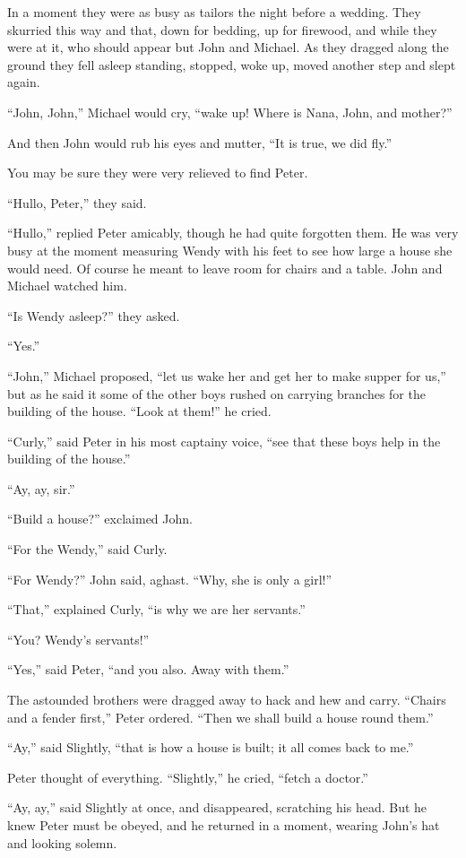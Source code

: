 In a moment they were as busy as tailors the night before a wedding.
They skurried this way and that, down for bedding, up for firewood, and
while they were at it, who should appear but John and Michael. As they
dragged along the ground they fell asleep standing, stopped, woke up,
moved another step and slept again.

``John, John,'' Michael would cry, ``wake up! Where is Nana, John, and
mother?''

And then John would rub his eyes and mutter, ``It is true, we did fly.''

You may be sure they were very relieved to find Peter.

``Hullo, Peter,'' they said.

``Hullo,'' replied Peter amicably, though he had quite forgotten them. He
was very busy at the moment measuring Wendy with his feet to see how
large a house she would need. Of course he meant to leave room for
chairs and a table. John and Michael watched him.

``Is Wendy asleep?'' they asked.

``Yes.''

``John,'' Michael proposed, ``let us wake her and get her to make supper
for us,'' but as he said it some of the other boys rushed on carrying
branches for the building of the house. ``Look at them!'' he cried.

``Curly,'' said Peter in his most captainy voice, ``see that these boys
help in the building of the house.''

``Ay, ay, sir.''

``Build a house?'' exclaimed John.

``For the Wendy,'' said Curly.

``For Wendy?'' John said, aghast. ``Why, she is only a girl!''

``That,'' explained Curly, ``is why we are her servants.''

``You? Wendy's servants!''

``Yes,'' said Peter, ``and you also. Away with them.''

The astounded brothers were dragged away to hack and hew and carry.
``Chairs and a fender first,'' Peter ordered. ``Then we shall build a
house round them.''

``Ay,'' said Slightly, ``that is how a house is built; it all comes back
to me.''

Peter thought of everything. ``Slightly,'' he cried, ``fetch a doctor.''

``Ay, ay,'' said Slightly at once, and disappeared, scratching his head.
But he knew Peter must be obeyed, and he returned in a moment, wearing
John's hat and looking solemn.

